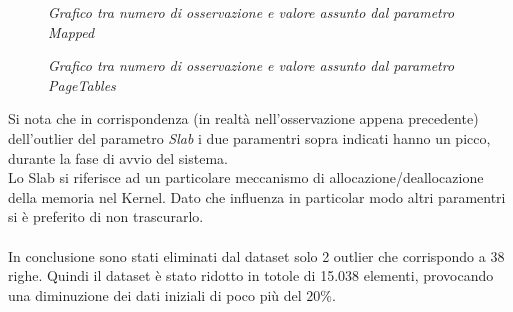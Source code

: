 \begin{figure}[H]
	\centering   
	\caption{\textit{Grafico tra numero di osservazione e valore assunto dal parametro Mapped}}
	\caption{\textit{Grafico tra numero di osservazione e valore assunto dal parametro PageTables}}
\end{figure}
Si nota che in corrispondenza (in realtà nell'osservazione appena precedente) dell'outlier del parametro \textit{Slab} i due paramentri sopra indicati hanno un picco, durante la fase di avvio del sistema.
\\Lo Slab si riferisce ad un particolare meccanismo di allocazione/deallocazione della memoria nel Kernel. Dato che influenza in particolar modo altri paramentri si è preferito di non trascurarlo.
\\
\vspace{0.5cm}
\\
In conclusione sono stati eliminati dal dataset solo 2 outlier che corrispondo a 38 righe. Quindi il dataset è stato ridotto in totole di 15.038 elementi, provocando una diminuzione dei dati iniziali di poco più del $20\%$.
\newpage

